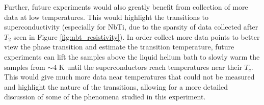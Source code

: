 \documentclass[prl,twocolumn,superscriptaddress,floatfix]{revtex4}
\begin{document}
Further, future experiments would also greatly benefit from collection of more data at low temperatures. This would highlight the transitions to superconductivity (especially for NbTi, due to the sparsity of data collected after $T_2$ seen in Figure \ref{fig:nbt_resistivity}).
In order collect more data points to better view the phase transition and estimate the transition temperature, future experiments can lift the samples above the liquid helium bath to slowly warm the samples from $\sim 4$ K until the superconductors reach temperatures near their $T_c$. This would give much more data near temperatures that could not be measured and highlight the nature of the transitions, allowing for a more detailed discussion of some of the phenomena studied in this experiment.







\end{document}
